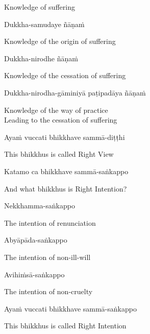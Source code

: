 \begin{cprenglish}
  Knowledge of suffering
\end{cprenglish}

Dukkha-samudaye ñāṇaṁ

\begin{cprenglish}
  Knowledge of the origin of suffering
\end{cprenglish}

Dukkha-nirodhe ñāṇaṁ

\begin{cprenglish}
  Knowledge of the cessation of suffering
\end{cprenglish}

Dukkha-nirodha-gāminiyā paṭipadāya ñāṇaṁ

\begin{cprenglish}
  Knowledge of the way of practice\\
  Leading to the cessation of suffering
\end{cprenglish}

Ayaṁ vuccati bhikkhave sammā-diṭṭhi

\begin{cprenglish}
  This bhikkhus is called Right View
\end{cprenglish}

Katamo ca bhikkhave sammā-saṅkappo

\begin{cprenglish}
  And what bhikkhus is Right Intention?
\end{cprenglish}

Nekkhamma-saṅkappo

\begin{cprenglish}
  The intention of renunciation
\end{cprenglish}

Abyāpāda-saṅkappo

\begin{cprenglish}
  The intention of non-ill-will
\end{cprenglish}

Avihiṁsā-saṅkappo

\begin{cprenglish}
  The intention of non-cruelty
\end{cprenglish}

Ayaṁ vuccati bhikkhave sammā-saṅkappo

\begin{cprenglish}
  This bhikkhus is called Right Intention
\end{cprenglish}

